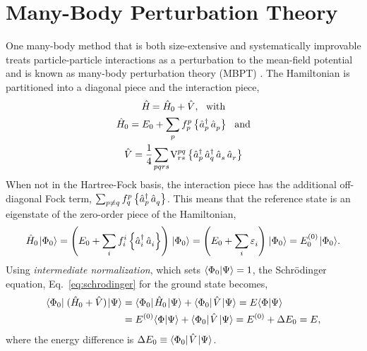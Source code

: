 \documentclass[thesis.tex]{subfiles}
\begin{document}
\section{Many-Body Perturbation Theory} \label{section:MBPT}
One many-body method that is both size-extensive and systematically improvable treats particle-particle interactions as a perturbation to the mean-field potential and is known as many-body perturbation theory (MBPT) \cite{MOLLER1934,HUBBARD1957539,HUGENHOLTZ1957481,SHAVITT2009}.  The Hamiltonian is partitioned into a diagonal piece and the interaction piece,
\begin{gather} \label{eq:mbpt_hamiltonian}
  \Ham = \Ham_{0} + \hat{V},\ \ \text{with} \notag \\
  \Ham_{0} = E_{0} + \sum_{\mathclap{p}}\fint{p}{p}\normord{\co{p}\ao{p}}\ \ \text{and} \notag \\
  \hat{V} = \frac{1}{4}\sum_{\mathclap{pqrs}}\vint{pq}{rs}\normord{\co{p}\co{q}\ao{s}\ao{r}}
\end{gather}
When not in the Hartree-Fock basis, the interaction piece has the additional off-diagonal Fock term, $\sum_{p\neq q}f^{p}_{q}\left\{\mathop{\hat{a}^{\dagger}_{p}}\mathop{\hat{a}^{}_{q}}\right\}$.  This means that the reference state is an eigenstate of the zero-order piece of the Hamiltonian,
\begin{equation}
  \Ham_{0}\refket = \left(E_{0} + \sum_{\mathclap{i}}\fint{i}{i}\normord{\co{i}\ao{i}}\right)\refket = \left(E_{0} + \sum_{\mathclap{i}}\Edenom{}{i}\right)\refket = E^{(0)}_{0}\refket.
\end{equation}
Using \textit{intermediate normalization}, which sets $\langle \Phi_{0} | \Psi\rangle = 1$, the Schr\"{o}dinger equation, Eq.\ \eqref{eq:schrodinger} for the ground state becomes,
\begin{align}
  \langle \Phi_{0} |\hspace{1pt}\mathop{(\hat{H}\hspace{-1pt}_{0} + \hat{V})}\hspace{1pt}\lvert \Psi \rangle &= \langle \Phi_{0} |\hspace{1pt}\hat{H}\hspace{-1pt}_{0}\hspace{1pt}\lvert \Psi \rangle + \langle \Phi_{0} |\hspace{1pt}\hat{V}\hspace{1pt}\lvert \Psi \rangle = E\langle \Phi | \Psi\rangle \notag \\
  &= E^{(0)}\langle \Phi | \Psi\rangle + \langle \Phi_{0} |\hspace{1pt}\hat{V}\hspace{1pt}\lvert \Psi \rangle = E^{(0)} + \Delta E_{0} = E, \label{eq:mbpt_schrodinger}
\end{align}
where the energy difference is $\Delta E_{0} \equiv \langle \Phi_{0} |\hspace{1pt}\hat{V}\hspace{1pt}\lvert \Psi \rangle$.
\end{document}
